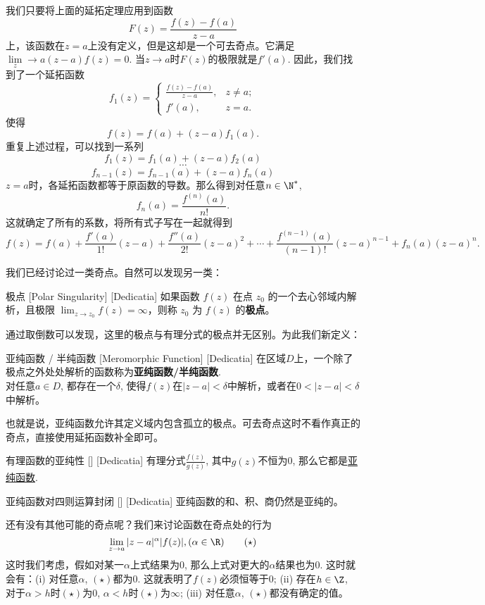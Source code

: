 \documentclass[UTF8]{ctexart}
\newcommand{\MeromorphicFunction}{\hyperref[dfn:MeromorphicFunction]{亚纯函数}}
\begin{document}
\begin{prf}
    我们只要将上面的延拓定理应用到函数
    \[F(z)=\frac{f(z)-f(a)}{z-a}\]
    上，该函数在$z=a$上没有定义，但是这却是一个可去奇点。它满足$\lim\limits_z\to a(z-a)f(z)=0$. 当$z\to a$时$F(z)$的极限就是$f'(a)$. 因此，我们找到了一个延拓函数
    \[f_1(z)=\begin{cases}
        \frac{f(z)-f(a)}{z-a}, & z\neq a;\\
        f'(a), &z=a.
    \end{cases}\]
    使得
    \[f(z)=f(a)+(z-a)f_1(a).\]
    重复上述过程，可以找到一系列
    \[f_1(z)=f_1(a)+(z-a)f_2(a)\]
    \[\cdots\]
    \[f_{n-1}(z)=f_{n-1}(a)+(z-a)f_n(a)\]
    $z=a$时，各延拓函数都等于原函数的导数。那么得到对任意$n\in\N^*$,
    \[f_n(a)=\frac{f^{(n)}(a)}{n!}.\]
    这就确定了所有的系数，将所有式子写在一起就得到
    \[f(z)=f(a)+\frac{f'(a)}{1!}(z-a)+\frac{f''(a)}{2!}(z-a)^2+\cdots+\frac{f^{(n-1)}(a)}{(n-1)!}(z-a)^{n-1}+f_n(a)(z-a)^n.\]
\end{prf}
我们已经讨论过一类奇点。自然可以发现另一类：
\begin{dfn}
    [PolarSingularity]
    {极点}
    [Polar Singularity]
    [Dedicatia]
    如果函数 \( f(z) \) 在点 \( z_0 \) 的一个去心邻域内解析，且极限 \( \lim_{z \to z_0} f(z) = \infty \)，则称 \( z_0 \) 为 \( f(z) \) 的\textbf{极点}。
\end{dfn}
通过取倒数可以发现，这里的极点与有理分式的极点并无区别。为此我们新定义：
\begin{dfn}
    [MeromorphicFunction]
    {亚纯函数 / 半纯函数}
    [Meromorphic Function]
    [Dedicatia]
    在区域$D$上，一个除了极点之外处处解析的函数称为\textbf{亚纯函数/半纯函数}.\\
    对任意$a\in D$, 都存在一个$\delta$, 使得$f(z)$在$|z-a|<\delta$中解析，或者在$0<|z-a|<\delta$中解析。
\end{dfn}
也就是说，亚纯函数允许其定义域内包含孤立的极点。可去奇点这时不看作真正的奇点，直接使用延拓函数补全即可。
\begin{crl}
    [UUID]
    {有理函数的亚纯性}
    []
    [Dedicatia]
    有理分式$\frac{f(z)}{g(z)}$, 其中$g(z)$不恒为0, 那么它都是\MeromorphicFunction.
\end{crl}
\begin{ppt}
    [UUID]
    {亚纯函数对四则运算封闭}
    []
    [Dedicatia]
    亚纯函数的和、积、商仍然是亚纯的。
\end{ppt}
还有没有其他可能的奇点呢？我们来讨论函数在奇点处的行为
\[\lim_{z\to a}|z-a|^\alpha |f(z)|, (\alpha\in\R)\tag{$\star$}\]
这时我们考虑，假如对某一$\alpha$上式结果为0, 那么上式对更大的$\alpha$结果也为0. 这时就会有：(i) 对任意$\alpha$, $(\star)$都为0. 这就表明了$f(z)$必须恒等于0; (ii) 存在$h\in\Z$, 对于$\alpha>h$时$(\star)$为0, $\alpha<h$时$(\star)$为$\infty$; (iii) 对任意$\alpha$, $(\star)$都没有确定的值。\\
\end{document}
